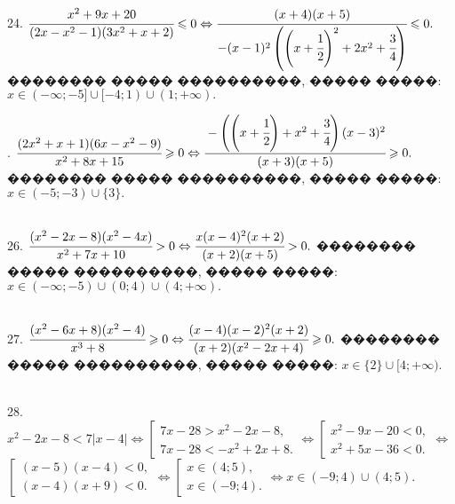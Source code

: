 \documentclass[12pt]{article}
\begin{document}
24. $\cfrac{x^2+9x+20}{(2x-x^2-1)(3x^2+x+2)}\leqslant0\Leftrightarrow \cfrac{(x+4)(x+5)}{-(x-1)^2\left(\left(x+\cfrac{1}{2}\right)^2+2x^2+\cfrac{3}{4}\right)}\leqslant0.$ �������� ����� ����������, ����� �����: $x\in
(-\infty;-5]\cup[-4;1)\cup(1;+\infty).$
\begin{figure}[ht!]
\end{figure}\newpage{}. $\cfrac{(2x^2+x+1)(6x-x^2-9)}{x^2+8x+15}\geqslant0\Leftrightarrow \cfrac{-\left(\left(x+\cfrac{1}{2}\right)+x^2+\cfrac{3}{4}\right)(x-3)^2}{(x+3)(x+5)}\geqslant0.$ �������� ����� ����������, ����� �����: $x\in
(-5;-3)\cup\{3\}.$
\begin{figure}[ht!]
\end{figure}\\
26. $\cfrac{(x^2-2x-8)(x^2-4x)}{x^2+7x+10}>0\Leftrightarrow\cfrac{x(x-4)^2(x+2)}{(x+2)(x+5)}>0.$ �������� ����� ����������, ����� �����: $x\in
(-\infty;-5)\cup(0;4)\cup(4;+\infty).$
\begin{figure}[ht!]
\end{figure}\\
27. $\cfrac{(x^2-6x+8)(x^2-4)}{x^3+8}\geqslant0\Leftrightarrow \cfrac{(x-4)(x-2)^2(x+2)}{(x+2)(x^2-2x+4)}\geqslant0.$ �������� ����� ����������, ����� �����: $x\in\{2\}\cup[4;+\infty).$
\begin{figure}[ht!]
\end{figure}\\
28. $x^2-2x-8<7|x-4|\Leftrightarrow \left[\begin{array}{l} 7x-28>x^2-2x-8,\\ 7x-28<-x^2+2x+8.\end{array}\right.\Leftrightarrow
\left[\begin{array}{l} x^2-9x-20<0,\\ x^2+5x-36<0.\end{array}\right.\Leftrightarrow$\\$
\left[\begin{array}{l} (x-5)(x-4)<0,\\ (x-4)(x+9)<0.\end{array}\right.\Leftrightarrow
\left[\begin{array}{l} x\in(4;5),\\ x\in(-9;4).\end{array}\right.\Leftrightarrow x\in (-9;4)\cup(4;5).$\\
\end{document}
